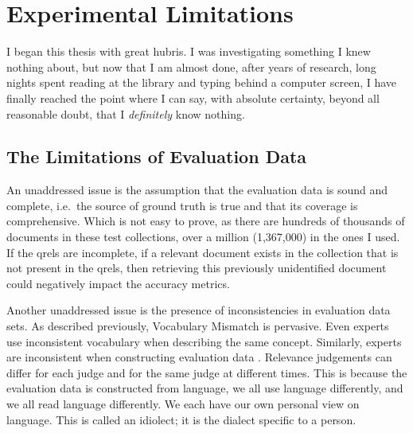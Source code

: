 \chapter{Experimental Limitations}





I began this thesis with great hubris. I was investigating something I knew nothing about, but now that I am almost done, after years of research, long nights spent reading at the library and typing behind a computer screen, I have finally reached the point where I can say, with absolute certainty, beyond all reasonable doubt, that I \textit{definitely} know nothing.

\section{The Limitations of Evaluation Data}
An unaddressed issue is the assumption that the evaluation data is sound and complete, i.e.\ the source of ground truth is true and that its coverage is comprehensive. Which is not easy to prove, as there are hundreds of thousands of documents in these test collections, over a million (1,367,000) in the ones I used. If the qrels are incomplete, if a relevant document exists in the collection that is not present in the qrels, then retrieving this previously unidentified document could negatively impact the accuracy metrics.

Another unaddressed issue is the presence of inconsistencies in evaluation data sets. As described previously, Vocabulary Mismatch is pervasive. Even experts use inconsistent vocabulary when describing the same concept. Similarly, experts are inconsistent when constructing evaluation data \cite{schamber1994relevance}. Relevance judgements can differ for each judge and for the same judge at different times. This is because the evaluation data is constructed from language, we all use language differently, and we all read language differently. We each have our own personal view on language. This is called an idiolect; it is the dialect specific to a person.

